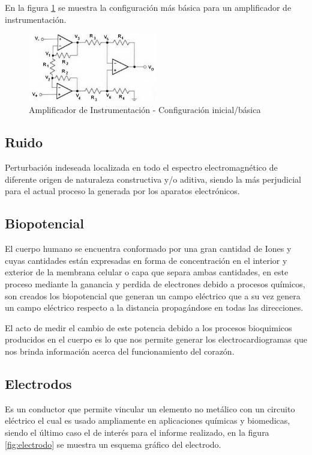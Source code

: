 \documentclass[conference]{IEEEtran}
\begin{document}
	En la figura \ref{fig:amplificador-instrumentacion} se muestra la configuración más básica para un amplificador de instrumentación.
	\begin{figure}[h]
		\centering
		\includegraphics[width=0.5\textwidth]{media/amplificador-instrumentacion}
		\caption{Amplificador de Instrumentación - Configuración inicial/básica}
		\label{fig:amplificador-instrumentacion}
	\end{figure}
	
	\subsection{Ruido}
	
	Perturbación indeseada localizada en todo el espectro electromagnético de diferente origen de naturaleza constructiva y/o aditiva, siendo la más perjudicial para el actual proceso la generada por los aparatos electrónicos.
	
	\subsection{Biopotencial}
	El cuerpo humano se encuentra conformado por una gran cantidad de Iones y cuyas cantidades están expresadas en forma de concentración en el interior y exterior de la membrana celular o capa que separa ambas cantidades, en este proceso mediante la ganancia y perdida de electrones debido a procesos químicos, son creados los biopotencial que generan un campo eléctrico que a su vez genera un campo eléctrico respecto a la distancia propagándose en todas las direcciones.
	
	El acto de medir el cambio de este potencia debido a los procesos bioquimicos producidos en el cuerpo es lo que nos permite generar los electrocardiogramas que nos brinda información acerca del funcionamiento del corazón.
	
	\subsection{Electrodos}
	Es un conductor que permite vincular un elemento no metálico con un circuito eléctrico el cual es usado ampliamente en aplicaciones químicas y biomedicas, siendo el último caso el de interés para el informe realizado, en la figura \ref{fig:electrodo} se muestra un esquema gráfico del electrodo.
	
\end{document}
